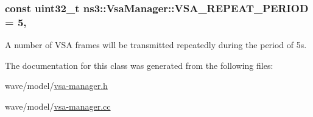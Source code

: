 \subsubsection[{\texorpdfstring{V\+S\+A\+\_\+\+R\+E\+P\+E\+A\+T\+\_\+\+P\+E\+R\+I\+OD}{VSA_REPEAT_PERIOD}}]{\setlength{\rightskip}{0pt plus 5cm}const uint32\+\_\+t ns3\+::\+Vsa\+Manager\+::\+V\+S\+A\+\_\+\+R\+E\+P\+E\+A\+T\+\_\+\+P\+E\+R\+I\+OD = 5\hspace{0.3cm}{\ttfamily [static]}, {\ttfamily [private]}}\hypertarget{classns3_1_1VsaManager_a552deee2b7263756fad4f3e95f4ef777}{}\label{classns3_1_1VsaManager_a552deee2b7263756fad4f3e95f4ef777}


A number of V\+SA frames will be transmitted repeatedly during the period of 5s. 



The documentation for this class was generated from the following files\+:\begin{DoxyCompactItemize}
\item 
wave/model/\hyperlink{vsa-manager_8h}{vsa-\/manager.\+h}\item 
wave/model/\hyperlink{vsa-manager_8cc}{vsa-\/manager.\+cc}\end{DoxyCompactItemize}
